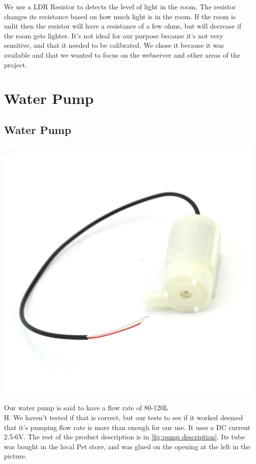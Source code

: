 \documentclass[a4paper,12pt,oneside,openright,titlepage]{book}
\begin{document}
We use a LDR Resistor to detects the level of light in the room. The resistor changes its resistance based on how much light is in the room. If the room is unlit then the resistor will have a resistance of a few ohms, but will decrease if the room gets lighter. It's not ideal for our purpose because it's not very sensitive, and that it needed to be calibrated. We chose it because it was available and that we wanted to focus on the webserver and other areas of the project.

\section{Water Pump}
\subsection{Water Pump}
\begin{center}
	\includegraphics[scale=0.3]{Water-Pump}
\end{center}

Our water pump is said to have a flow rate of 80-120L\\H. We haven't tested if that is correct, but our tests to see if it worked deemed that it's pumping flow rate is more than enough for our use. It uses a DC current 2.5-6V. The rest of the product description is in \ref{fig:pump description}. Its tube was bought in the local Pet store, and was glued on the opening at the left in the picture.
\end{document}
